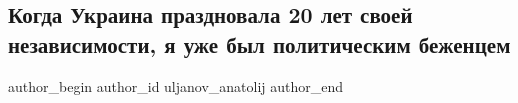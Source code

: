  
 
 
 
 
 
\subsection{Когда Украина праздновала 20 лет своей независимости, я уже был политическим беженцем}
\label{sec:23_08_2021.fb.uljanov_anatolij.1.nezavisimost_bezhenec}
 
\ifcmt
 author_begin
   author_id uljanov_anatolij
 author_end
\fi

